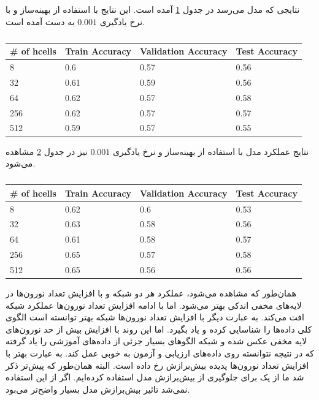 \documentclass[12pt, a4paper]{book}
\begin{document}
نتایجی که مدل  می‌رسد در جدول \ref{lstm_single_layer} آمده است.
این نتایج با استفاده از بهینه‌ساز  و با نرخ یادگیری $0.001$
به دست آمده است.

\begin{latin}
    \begin{table}[h]
    \centering
    \caption{}
    \label{lstm_single_layer}
    \begin{tabular}{l|l|l|l}
        \rowcolor{teal!50}
        \# of hcells & Train Accuracy & Validation Accuracy & Test Accuracy \\
        \hline
        8 & 0.6 & 0.57 & 0.56 \\
        32 & 0.61 & 0.59 & 0.56 \\
        64 & 0.62 & 0.57 & 0.58 \\
        256 & 0.62 & 0.57 & 0.57 \\
        512 & 0.59 & 0.57 & 0.55 \\
    \end{tabular}
    \end{table}
\end{latin}

نتایج عملکرد مدل  با استفاده از بهینه‌ساز  و نرخ یادگیری $0.001$ نیز در جدول \ref{gru_single_layer}
مشاهده می‌شود.

\clearpage

\begin{latin}
    \begin{table}[h]
    \centering
    \caption{}
    \label{gru_single_layer}
    \begin{tabular}{l|l|l|l}
        \rowcolor{teal!50}
        \# of hcells & Train Accuracy & Validation Accuracy & Test Accuracy \\
        \hline
        8 & 0.62 & 0.6 & 0.53 \\
        32 & 0.63 & 0.58 & 0.56 \\
        64 & 0.61 & 0.58 & 0.57 \\
        256 & 0.65 & 0.57 & 0.58 \\
        512 & 0.65 & 0.56 & 0.56 \\
    \end{tabular}
    \end{table}
\end{latin}

همان‌طور که مشاهده می‌شود، عملکرد هر دو شبکه  و  با افزایش تعداد نورون‌ها در لایه‌های مخفی
اندکی بهتر می‌شود. اما با ادامه افزایش تعداد نورون‌ها عملکرد شبکه افت می‌کند. به عبارت دیگر با افزایش تعداد نورون‌ها شبکه
بهتر توانسته است الگوی کلی داده‌ها را شناسایی کرده و یاد بگیرد.
اما این روند با افزایش بیش‌ از حد نورون‌های لایه مخفی عکس شده و شبکه الگوهای بسیار جزئی از
داده‌های آموزشی را یاد گرفته که در نتیجه نتوانسته روی داده‌های ارزیابی و آزمون به خوبی عمل کند. به عبارت بهتر
با افزایش تعداد نورون‌ها پدیده بیش‌برازش رخ داده است. البته همان‌طور که پیش‌تر ذکر شد ما از یک 
برای جلوگیری از بیش‌برازش مدل استفاده کرده‌ایم. اگر از این 
استفاده نمی‌شد تاثیر بیش‌برازش مدل بسیار واضح‌تر می‌بود.
\end{document}
